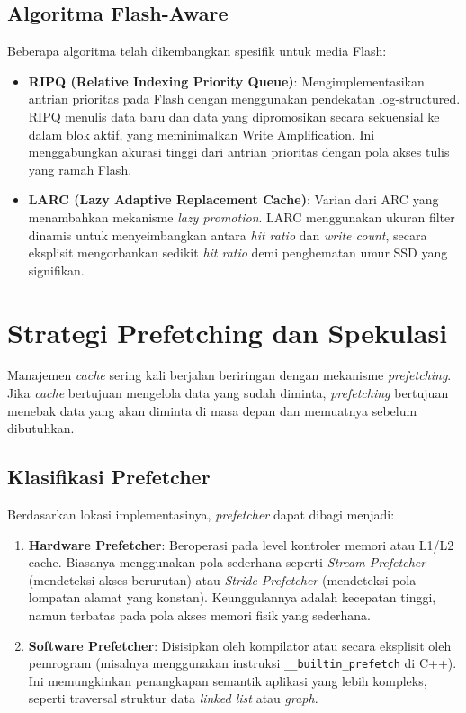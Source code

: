 \subsection{Algoritma Flash-Aware}
Beberapa algoritma telah dikembangkan spesifik untuk media Flash:
\begin{itemize}
  \item \textbf{RIPQ (Relative Indexing Priority Queue)}: Mengimplementasikan
    antrian prioritas pada Flash dengan menggunakan pendekatan log-structured.
    RIPQ menulis data baru dan data yang dipromosikan secara sekuensial
    ke dalam blok aktif, yang meminimalkan Write Amplification.
    Ini menggabungkan akurasi tinggi dari antrian prioritas dengan
    pola akses tulis yang ramah Flash.
  \item \textbf{LARC (Lazy Adaptive Replacement Cache)}: Varian dari ARC
    yang menambahkan mekanisme \textit{lazy promotion}. LARC menggunakan
    ukuran filter dinamis untuk menyeimbangkan antara \textit{hit ratio}
    dan \textit{write count}, secara eksplisit mengorbankan sedikit
    \textit{hit ratio} demi penghematan umur SSD yang signifikan.
\end{itemize}

\section{Strategi Prefetching dan Spekulasi}
Manajemen \textit{cache} sering kali berjalan beriringan dengan mekanisme
\textit{prefetching}. Jika \textit{cache} bertujuan mengelola data yang
sudah diminta, \textit{prefetching} bertujuan menebak data yang akan
diminta di masa depan dan memuatnya sebelum dibutuhkan.

\subsection{Klasifikasi Prefetcher}
Berdasarkan lokasi implementasinya, \textit{prefetcher} dapat dibagi menjadi:
\begin{enumerate}
  \item \textbf{Hardware Prefetcher}: Beroperasi pada level kontroler
    memori atau L1/L2 cache. Biasanya menggunakan pola sederhana seperti
    \textit{Stream Prefetcher} (mendeteksi akses berurutan) atau
    \textit{Stride Prefetcher} (mendeteksi pola lompatan alamat yang konstan).
    Keunggulannya adalah kecepatan tinggi, namun terbatas pada pola akses
    memori fisik yang sederhana.
  \item \textbf{Software Prefetcher}: Disisipkan oleh kompilator atau
    secara eksplisit oleh pemrogram (misalnya menggunakan instruksi
    \texttt{\_\_builtin\_prefetch} di C++). Ini memungkinkan penangkapan
    semantik aplikasi yang lebih kompleks, seperti traversal struktur data
    \textit{linked list} atau \textit{graph}.
\end{enumerate}

